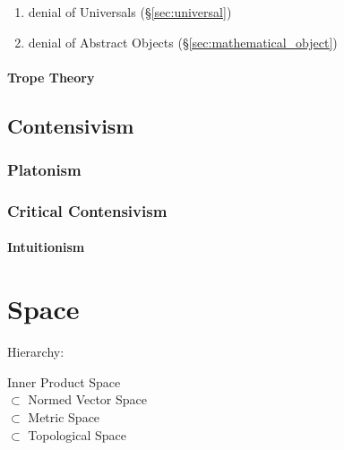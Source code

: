 \begin{enumerate}
  \item denial of Universals (\S\ref{sec:universal})
  \item denial of Abstract Objects (\S\ref{sec:mathematical_object})
\end{enumerate}



\paragraph{Trope Theory}\label{sec:trope_theory}



\subsection{Contensivism}\label{sec:contensivism}

\subsubsection{Platonism}\label{sec:platonism}

\subsubsection{Critical Contensivism}\label{sec:critical_contensivism}

\paragraph{Intuitionism}\label{sec:intuitionism}



\section{Space}\label{sec:space}

Hierarchy:

Inner Product Space \hfill \\
$\subset$ Normed Vector Space \hfill \\
$\subset$ Metric Space \hfill \\
$\subset$ Topological Space
